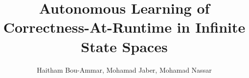 \title{Autonomous Learning  of Correctness-At-Runtime in Infinite State Spaces}

\author{Haitham Bou-Ammar, Mohamad Jaber, Mohamad Nassar}
